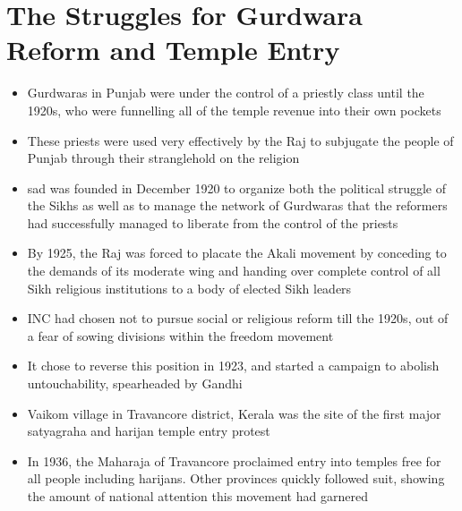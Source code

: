 \section{The Struggles for Gurdwara Reform and Temple Entry}
\begin{itemize}
    \item Gurdwaras in Punjab were under the control of a priestly class until the 1920s, who were funnelling all of the temple revenue into their own pockets
    \item These priests were used very effectively by the Raj to subjugate the people of Punjab through their stranglehold on the religion
    \item \acrshort{sad} was founded in December 1920 to organize both the political struggle of the Sikhs as well as to manage the network of Gurdwaras that the reformers had successfully managed to liberate from the control of the priests
    \item By 1925, the Raj was forced to placate the Akali movement by conceding to the demands of its moderate wing and handing over complete control of all Sikh religious institutions to a body of elected Sikh leaders
    \item INC had chosen not to pursue social or religious reform till the 1920s, out of a fear of sowing divisions within the freedom movement
    \item It chose to reverse this position in 1923, and started a campaign to abolish untouchability, spearheaded by Gandhi
    \item Vaikom village in Travancore district, Kerala was the site of the first major satyagraha and harijan temple entry protest
    \item In 1936, the Maharaja of Travancore proclaimed entry into temples free for all people including harijans. Other provinces quickly followed suit, showing the amount of national attention this movement had garnered
\end{itemize}


